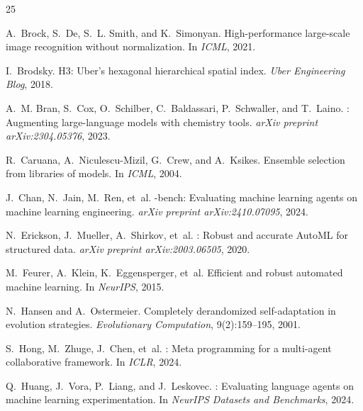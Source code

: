 \documentclass{article}
\begin{document}
\begin{thebibliography}{25}

A.~Brock, S.~De, S.~L. Smith, and K.~Simonyan.
\newblock High-performance large-scale image recognition without normalization.
\newblock In \emph{ICML}, 2021.

I.~Brodsky.
\newblock H3: Uber's hexagonal hierarchical spatial index.
\newblock \emph{Uber Engineering Blog}, 2018.

A.~M. Bran, S.~Cox, O.~Schilber, C.~Baldassari, P.~Schwaller, and T.~Laino.
: Augmenting large-language models with chemistry tools.
\newblock \emph{arXiv preprint arXiv:2304.05376}, 2023.

R.~Caruana, A.~Niculescu-Mizil, G.~Crew, and A.~Ksikes.
\newblock Ensemble selection from libraries of models.
\newblock In \emph{ICML}, 2004.

J.~Chan, N.~Jain, M.~Ren, et~al.
-bench: Evaluating machine learning agents on machine learning engineering.
\newblock \emph{arXiv preprint arXiv:2410.07095}, 2024.

N.~Erickson, J.~Mueller, A.~Shirkov, et~al.
: Robust and accurate {AutoML} for structured data.
\newblock \emph{arXiv preprint arXiv:2003.06505}, 2020.

M.~Feurer, A.~Klein, K.~Eggensperger, et~al.
\newblock Efficient and robust automated machine learning.
\newblock In \emph{NeurIPS}, 2015.

N.~Hansen and A.~Ostermeier.
\newblock Completely derandomized self-adaptation in evolution strategies.
\newblock \emph{Evolutionary Computation}, 9(2):159--195, 2001.

S.~Hong, M.~Zhuge, J.~Chen, et~al.
: Meta programming for a multi-agent collaborative framework.
\newblock In \emph{ICLR}, 2024.

Q.~Huang, J.~Vora, P.~Liang, and J.~Leskovec.
: Evaluating language agents on machine learning experimentation.
\newblock In \emph{NeurIPS Datasets and Benchmarks}, 2024.


\end{thebibliography}
\end{document}
